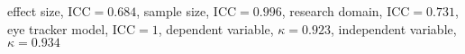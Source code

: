 effect size, $\textrm{ICC} = 0.684$, sample size, $\textrm{ICC} = 0.996$, research domain, $\textrm{ICC} = 0.731$, eye tracker model, $\textrm{ICC} = 1$, dependent variable, $\kappa = 0.923$, independent variable, $\kappa = 0.934$